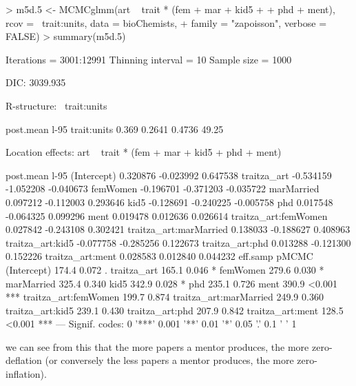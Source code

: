 \documentclass{article}
\begin{document}
\begin{Schunk}
\begin{Sinput}
> m5d.5 <- MCMCglmm(art ~ trait * (fem + mar + kid5 + 
+     phd + ment), rcov = ~trait:units, data = bioChemists, 
+     family = "zapoisson", verbose = FALSE)
> summary(m5d.5)
\end{Sinput}
\begin{Soutput}
 Iterations = 3001:12991
 Thinning interval  = 10
 Sample size  = 1000 

 DIC: 3039.935 

 R-structure:  ~trait:units

            post.mean l-95%
trait:units     0.369   0.2641   0.4736    49.25

 Location effects: art ~ trait * (fem + mar + kid5 + phd + ment) 

                       post.mean  l-95%
(Intercept)             0.320876 -0.023992  0.647538
traitza_art            -0.534159 -1.052208 -0.040673
femWomen               -0.196701 -0.371203 -0.035722
marMarried              0.097212 -0.112003  0.293646
kid5                   -0.128691 -0.240225 -0.005758
phd                     0.017548 -0.064325  0.099296
ment                    0.019478  0.012636  0.026614
traitza_art:femWomen    0.027842 -0.243108  0.302421
traitza_art:marMarried  0.138033 -0.188627  0.408963
traitza_art:kid5       -0.077758 -0.285256  0.122673
traitza_art:phd         0.013288 -0.121300  0.152226
traitza_art:ment        0.028583  0.012840  0.044232
                       eff.samp  pMCMC    
(Intercept)               174.4  0.072 .  
traitza_art               165.1  0.046 *  
femWomen                  279.6  0.030 *  
marMarried                325.4  0.340    
kid5                      342.9  0.028 *  
phd                       235.1  0.726    
ment                      390.9 <0.001 ***
traitza_art:femWomen      199.7  0.874    
traitza_art:marMarried    249.9  0.360    
traitza_art:kid5          239.1  0.430    
traitza_art:phd           207.9  0.842    
traitza_art:ment          128.5 <0.001 ***
---
Signif. codes:  
0 '***' 0.001 '**' 0.01 '*' 0.05 '.' 0.1 ' ' 1
\end{Soutput}
\end{Schunk}

we can see from this that the more papers a mentor produces, the more zero-deflation (or conversely the less papers a mentor produces, the more zero-inflation).

\ifalone
\end{document}
